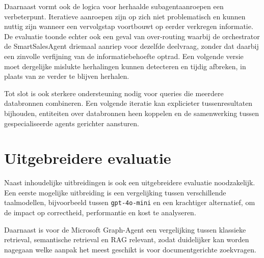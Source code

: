 Daarnaast vormt ook de logica voor herhaalde subagentaanroepen een verbeterpunt. Iteratieve aanroepen zijn op zich niet problematisch en kunnen nuttig zijn wanneer een vervolgstap voortbouwt op eerder verkregen informatie. De evaluatie toonde echter ook een geval van over-routing waarbij de orchestrator de SmartSalesAgent driemaal aanriep voor dezelfde deelvraag, zonder dat daarbij een zinvolle verfijning van de informatiebehoefte optrad. Een volgende versie moet dergelijke mislukte herhalingen kunnen detecteren en tijdig afbreken, in plaats van ze verder te blijven herhalen.

Tot slot is ook sterkere ondersteuning nodig voor queries die meerdere databronnen combineren. Een volgende iteratie kan explicieter tussenresultaten bijhouden, entiteiten over databronnen heen koppelen en de samenwerking tussen gespecialiseerde agents gerichter aansturen.

\section{Uitgebreidere evaluatie}
\label{sec:Uitgebreidere evaluatie}
Naast inhoudelijke uitbreidingen is ook een uitgebreidere evaluatie noodzakelijk. Een eerste mogelijke uitbreiding is een vergelijking tussen verschillende taalmodellen, bijvoorbeeld tussen \texttt{gpt-4o-mini} en een krachtiger alternatief, om de impact op correctheid, performantie en kost te analyseren.

Daarnaast is voor de Microsoft Graph-Agent een vergelijking tussen klassieke retrieval, semantische retrieval en \gls{RAG} relevant, zodat duidelijker kan worden nagegaan welke aanpak het meest geschikt is voor documentgerichte zoekvragen.


